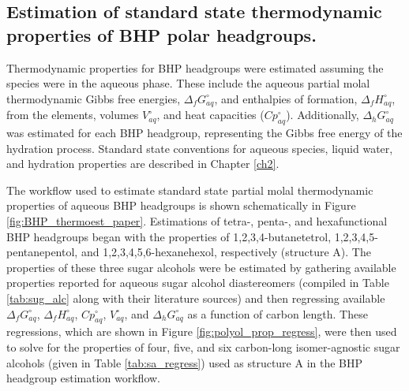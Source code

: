 \subsection{Estimation of standard state thermodynamic properties of BHP polar headgroups.}
Thermodynamic properties for BHP headgroups were estimated assuming the species were in the aqueous phase. These include the aqueous partial molal thermodynamic Gibbs free energies, $\Delta_{f}G_{aq}^{\circ}$, and enthalpies of formation, $\Delta_{f}H_{aq}^{\circ}$, from the elements, volumes $V_{aq}^{\circ}$, and heat capacities ($Cp_{aq}^{\circ}$). Additionally, $\Delta_{h}G^{\circ}_{aq}$ was estimated for each BHP headgroup, representing the Gibbs free energy of the hydration process. Standard state conventions for aqueous species, liquid water, and hydration properties are described in Chapter \ref{ch2}.

The workflow used to estimate standard state partial molal thermodynamic properties of aqueous BHP headgroups is shown schematically in Figure \ref{fig:BHP_thermoest_paper}. Estimations of tetra-, penta-, and hexafunctional BHP headgroups began with the properties of 1,2,3,4-butanetetrol, 1,2,3,4,5-pentanepentol, and 1,2,3,4,5,6-hexanehexol, respectively (structure A). The properties of these three sugar alcohols were be estimated by gathering available properties reported for aqueous sugar alcohol diastereomers (compiled in Table \ref{tab:sug_alc} along with their literature sources) and then regressing available $\Delta_{f}G^{\circ}_{aq}$, $\Delta_{f}H^{\circ}_{aq}$, $Cp^{\circ}_{aq}$, $V^{\circ}_{aq}$, and $\Delta_{h}G^{\circ}_{aq}$ as a function of carbon length. These regressions, which are shown in Figure \ref{fig:polyol_prop_regress}, were then used to solve for the properties of four, five, and six carbon-long isomer-agnostic sugar alcohols (given in Table \ref{tab:sa_regress}) used as structure A in the BHP headgroup estimation workflow.


